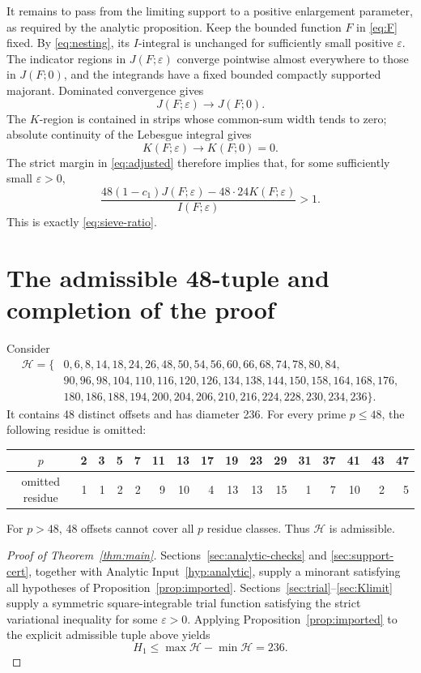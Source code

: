 \documentclass[11pt]{article}
\theoremstyle{definition}
\theoremstyle{remark}
\newcommand{\eps}{\varepsilon}
\begin{document}
It remains to pass from the limiting support to a positive enlargement
parameter, as required by the analytic proposition.  Keep the bounded function
\(F\) in \eqref{eq:F} fixed.  By \eqref{eq:nesting}, its \(I\)-integral is
unchanged for sufficiently small positive \(\eps\).  The indicator regions in
\(J(F;\eps)\) converge pointwise almost everywhere to those in \(J(F;0)\), and
the integrands have a fixed bounded compactly supported majorant.  Dominated
convergence gives
\[
 J(F;\eps)\longrightarrow J(F;0).
\]
The \(K\)-region is contained in strips whose common-sum width tends to zero;
absolute continuity of the Lebesgue integral gives
\[
 K(F;\eps)\longrightarrow K(F;0)=0.
\]
The strict margin in \eqref{eq:adjusted} therefore implies that, for some
sufficiently small \(\eps>0\),
\[
 \frac{48(1-c_1)J(F;\eps)-48\cdot24K(F;\eps)}{I(F;\eps)}>1.
\]
This is exactly \eqref{eq:sieve-ratio}.

\section{The admissible 48-tuple and completion of the proof}
\label{sec:tuple}

Consider
\begin{align*}
\mathcal H=\{&0,6,8,14,18,24,26,48,50,54,56,60,66,68,74,78,80,84,\\
&90,96,98,104,110,116,120,126,134,138,144,150,158,164,168,176,\\
&180,186,188,194,200,204,206,210,216,224,228,230,234,236\}.
\end{align*}
It contains 48 distinct offsets and has diameter 236.  For every prime
\(p\leq48\), the following residue is omitted:
\begin{center}
\begin{tabular}{c|rrrrrrrrrrrrrrr}
\toprule
\(p\)&2&3&5&7&11&13&17&19&23&29&31&37&41&43&47\\
\midrule
omitted residue&1&1&2&2&9&10&4&13&13&15&1&7&10&2&5\\
\bottomrule
\end{tabular}
\end{center}
For \(p>48\), 48 offsets cannot cover all \(p\) residue classes.  Thus
\(\mathcal H\) is admissible.

\begin{proof}[Proof of Theorem~\ref{thm:main}]
Sections~\ref{sec:analytic-checks} and \ref{sec:support-cert}, together with
Analytic Input~\ref{hyp:analytic}, supply a minorant satisfying all hypotheses
of Proposition~\ref{prop:imported}.  Sections~\ref{sec:trial}--\ref{sec:Klimit}
supply a symmetric square-integrable trial function satisfying the strict
variational inequality for some \(\eps>0\).  Applying
Proposition~\ref{prop:imported} to the explicit admissible tuple above yields
\[
 H_1\leq\max\mathcal H-\min\mathcal H=236.
\]
\end{proof}
\end{document}
